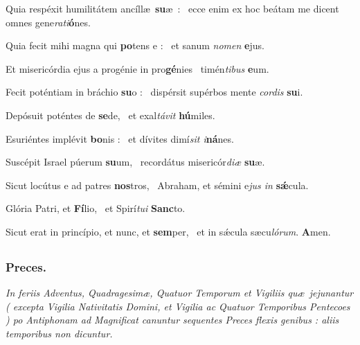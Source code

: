 \documentclass[12pt]{article} %
\def\noinitial{%
\setspaceafterinitial{0pt plus 0em minus 0em}%
\setspacebeforeinitial{0pt plus 0em minus 0em}%
\relax %
}
\newenvironment{psalmtext}{\leftskip 0.25in}{\vspace{2 mm}}
\newenvironment{rubric}{\color{benred8} \itshape \leftskip 0in \setlength{\parindent}{0.25in}}{\vspace{2 mm}}
\let\oldgresixstar\gresixstar
\renewcommand{\gresixstar}{\textcolor{benred8}{\oldgresixstar}}
\begin{document}
\begin{psalmtext}
Quia resp\'{e}xit humilit\'{a}tem anc\'{i}ll\ae\ \textbf{su}\ae\ : \gresixstar\ ecce enim ex hoc be\'{a}tam me dicent omnes gene\emph{rati}\textbf{\'{o}}nes.

Quia fecit mihi magna qui \textbf{po}tens e : \gresixstar\ et sanum \emph{nomen} \textbf{e}jus.

Et miseric\'{o}rdia ejus a prog\'{e}nie in pro\textbf{g\'{e}}nies \gresixstar\ tim\'{e}n\emph{tibus} \textbf{e}um.

Fecit pot\'{e}ntiam in br\'{a}chio \textbf{su}o : \gresixstar\ disp\'{e}rsit sup\'{e}rbos mente \emph{cordis} \textbf{su}i.

Dep\'{o}suit pot\'{e}ntes de \textbf{se}de, \gresixstar\ et exal\emph{t\'{a}vit} \textbf{h\'{u}}miles.

Esuri\'{e}ntes impl\'{e}vit \textbf{bo}nis : \gresixstar\ et d\'{i}vites dim\'{i}\emph{sit i}\textbf{n\'{a}}nes.

Susc\'{e}pit Israel p\'{u}erum \textbf{su}um, \gresixstar\ record\'{a}tus miseric\'{o}r\emph{di\ae} \textbf{su}\ae.

Sicut loc\'{u}tus e ad patres \textbf{nos}tros, \gresixstar\ Abraham, et s\'{e}mini e\emph{jus in} \textbf{s\'{\ae}}cula.

Glória Patri, et \textbf{Fí}lio, \gresixstar\ et Spirí\emph{tui} \textbf{Sanc}to.

Sicut erat in princípio, et nunc, et \textbf{sem}per, \gresixstar\ et in sǽcula sæcu\emph{lórum}. \textbf{A}men.

\end{psalmtext}

{\noinitial
{}

}


\subsection*{}

\subsubsection*{Preces.}

\begin{rubric}
In feriis Adventus, Quadragesim\ae , Quatuor Temporum et Vigiliis qu\ae\ jejunantur ( excepta Vigilia Nativitatis Domini, et Vigilia ac Quatuor Temporibus Pentecoes ) po Antiphonam ad Magnificat canuntur sequentes Preces flexis genibus : aliis temporibus non dicuntur.

\end{rubric}
\end{document}
